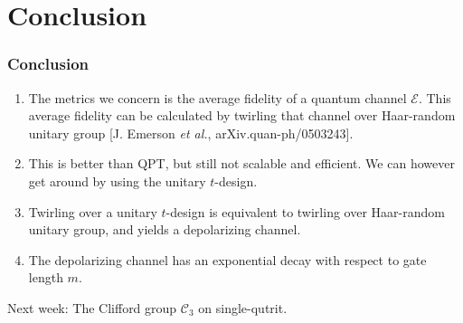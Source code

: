 \documentclass{beamer}
\begin{document}
\section{Conclusion}
\begin{frame}
  \frametitle{Conclusion}
  \begin{enumerate}
    \item The metrics we concern is the average fidelity of a quantum channel $\mathcal{E}$. This average fidelity can be calculated by twirling that channel over Haar-random unitary group [J. Emerson \textit{et al.}, arXiv.quan-ph/0503243].
    \item This is better than QPT, but still not scalable and efficient. We can however get around by using the unitary $t$-design. 
    \item Twirling over a unitary $t$-design is equivalent to twirling over Haar-random unitary group, and yields a depolarizing channel.
    \item The depolarizing channel has an exponential decay with respect to gate length $m$. 
  \end{enumerate}
  Next week: The Clifford group $\mathcal{C}_3$ on single-qutrit.

\end{frame}
\end{document}
